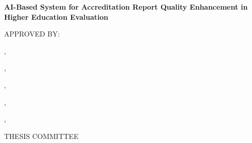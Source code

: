 \begin{center}

\Large
\textbf{AI-Based System for Accreditation Report Quality Enhancement in Higher Education Evaluation}


\vspace{3cm}

\large
APPROVED BY:\\
\vspace{1cm}

\underline{\hspace{5cm}},\\

\vspace{1cm}

\underline{\hspace{5cm}},\\

\vspace{1cm}

\underline{\hspace{5cm}},\\

\vspace{1cm}

\underline{\hspace{5cm}},\\

\vspace{1cm}

\underline{\hspace{5cm}},\\

\vspace{3cm}

THESIS COMMITTEE
    
\end{center}







\pagebreak